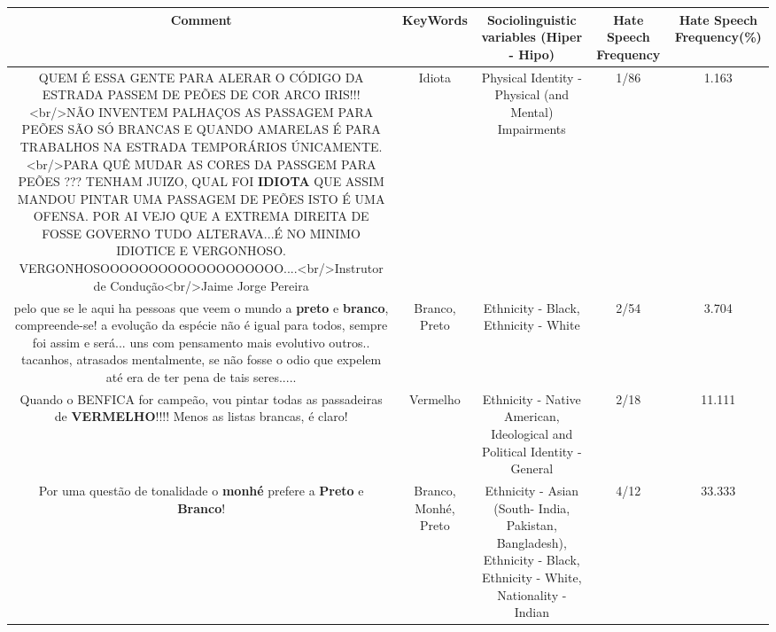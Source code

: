 \documentclass[11pt]{article}
\newlength\mylength
\begin{document}
\begin{center}
\setlength\mylength{\dimexpr\textwidth - 1\arrayrulewidth - 50\tabcolsep}
\begin{longtable}{|C{.65\mylength}|C{.30\mylength}|C{.12\mylength}|C{.12\mylength}|C{.12\mylength}|}
\hline
\textbf{Comment} & \textbf{KeyWords} & \textbf{Sociolinguistic variables (Hiper - Hipo)}  & \textbf{Hate Speech Frequency} & \textbf{Hate Speech Frequency(\%)} \\
\hline{}\small QUEM É ESSA GENTE PARA ALERAR O CÓDIGO DA ESTRADA PASSEM DE PEÕES DE COR ARCO IRIS!!! <br/>NÃO INVENTEM PALHAÇOS AS PASSAGEM PARA PEÕES SÃO SÓ BRANCAS E QUANDO AMARELAS É PARA TRABALHOS NA ESTRADA TEMPORÁRIOS ÚNICAMENTE. <br/>PARA QUÊ MUDAR AS CORES DA PASSGEM PARA PEÕES ??? TENHAM JUIZO, QUAL FOI \textbf{IDIOTA} QUE ASSIM MANDOU PINTAR UMA PASSAGEM DE PEÕES ISTO É UMA OFENSA. POR AI VEJO QUE A EXTREMA DIREITA DE FOSSE GOVERNO TUDO ALTERAVA...É NO MINIMO IDIOTICE E VERGONHOSO. VERGONHOSOOOOOOOOOOOOOOOOOOO....<br/>Instrutor de Condução<br/>Jaime Jorge Pereira\normalsize   & Idiota & Physical Identity - Physical (and Mental) Impairments & 1/86 & 1.163 \\  \hline
  \small pelo que se le aqui ha pessoas que veem o mundo a \textbf{preto} e \textbf{branco}, compreende-se! a evolução da espécie não é igual para todos, sempre foi assim e será... uns com pensamento mais evolutivo  outros.. tacanhos, atrasados mentalmente, se não fosse o odio que expelem até era de ter pena de tais seres.....\normalsize   & Branco, Preto & Ethnicity - Black, Ethnicity - White & 2/54 & 3.704 \\  \hline
  \small Quando o BENFICA for campeão, vou pintar todas as passadeiras de \textbf{V\textbf{ERMELHO}}!!!! Menos as listas brancas, é claro!\normalsize   & Vermelho & Ethnicity - Native American, Ideological and Political Identity - General & 2/18 & 11.111 \\  \hline
  \small Por uma questão de tonalidade o \textbf{m\textbf{onhé}} prefere a \textbf{Preto} e \textbf{Branco}!\normalsize   & Branco, Monhé, Preto & Ethnicity - Asian (South- India, Pakistan, Bangladesh), Ethnicity - Black, Ethnicity - White, Nationality - Indian & 4/12 & 33.333 \\  \hline

\end{longtable}
\end{center}
\end{document}
